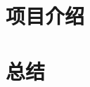 \documentclass[15pt]{ctexart}
\begin{document}

\tableofcontents
\newpage
\section{项目介绍} %
\label{sec:项目介绍}





\section{总结} %
\label{sec:总结}

\end{document}
